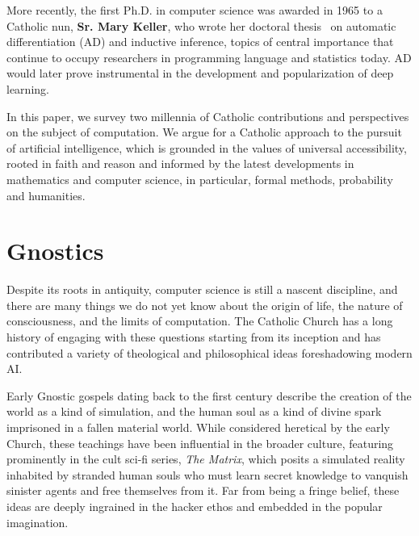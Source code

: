 \documentclass[sigplan,nonacm]{acmart}\settopmatter{printfolios=false,printccs=false,printacmref=false}
\begin{document}

More recently, the first Ph.D. in computer science was awarded in 1965 to a Catholic nun, \textbf{Sr. Mary Keller}, who wrote her doctoral thesis~\cite{keller1965inductive} on automatic differentiation (AD) and inductive inference, topics of central importance that continue to occupy researchers in programming language and statistics today. AD would later prove instrumental in the development and popularization of deep learning.

In this paper, we survey two millennia of Catholic contributions and perspectives on the subject of computation. We argue for a Catholic approach to the pursuit of artificial intelligence, which is grounded in the values of universal accessibility, rooted in faith and reason and informed by the latest developments in mathematics and computer science, in particular, formal methods, probability and humanities.

\section{Gnostics}

Despite its roots in antiquity, computer science is still a nascent discipline, and there are many things we do not yet know about the origin of life, the nature of consciousness, and the limits of computation. The Catholic Church has a long history of engaging with these questions starting from its inception and has contributed a variety of theological and philosophical ideas foreshadowing modern AI.

Early Gnostic gospels dating back to the first century describe the creation of the world as a kind of simulation, and the human soul as a kind of divine spark imprisoned in a fallen material world. While considered heretical by the early Church, these teachings have been influential in the broader culture, featuring prominently in the cult sci-fi series, \textit{The Matrix}, which posits a simulated reality inhabited by stranded human souls who must learn secret knowledge to vanquish sinister agents and free themselves from it. Far from being a fringe belief, these ideas are deeply ingrained in the hacker ethos and embedded in the popular imagination.
\end{document}
